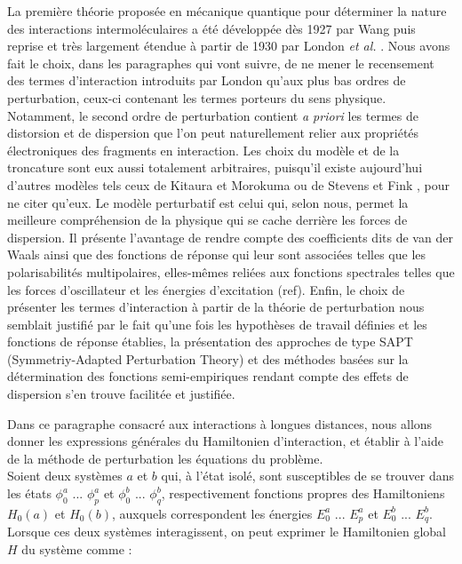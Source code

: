 \documentclass[12pt,a4paper]{book}
\begin{document}
	
	La première théorie proposée en mécanique quantique pour déterminer la nature des interactions intermoléculaires a été développée dès 1927 par Wang \cite{wang1927mutual} puis reprise et très largement étendue à partir de 1930 par London \textit{et al.} \cite{london1930z}. Nous avons fait le choix, dans les paragraphes qui vont suivre, de ne mener le recensement des termes d’interaction introduits par London qu'aux plus bas ordres de perturbation, ceux-ci contenant les termes porteurs du sens physique. Notamment, le second ordre de perturbation contient \textit{a priori} les termes de distorsion et de dispersion que l’on peut naturellement relier aux propriétés électroniques des fragments en interaction. Les choix du modèle et de la troncature sont eux aussi totalement arbitraires, puisqu’il existe aujourd’hui d’autres modèles tels ceux de Kitaura et Morokuma \cite{morokuma1977molecules} ou de Stevens et Fink \cite{stevens1987frozen}, pour ne citer qu’eux. Le modèle perturbatif est celui qui, selon nous, permet la meilleure compréhension de la physique qui se cache derrière les forces de dispersion. Il présente l'avantage de rendre compte des coefficients dits de van der Waals ainsi que des fonctions de réponse qui leur sont associées telles que les polarisabilités multipolaires, elles-mêmes reliées aux fonctions spectrales telles que les forces d’oscillateur et les énergies d’excitation (ref). Enfin, le choix de présenter les termes d’interaction à partir de la théorie de perturbation nous semblait justifié par le fait qu’une fois les hypothèses de travail définies et les fonctions de réponse établies, la présentation des approches de type SAPT (Symmetriy-Adapted Perturbation Theory) et des méthodes basées sur la détermination des fonctions semi-empiriques rendant compte des effets de dispersion s’en trouve facilitée et justifiée.
	
	
	Dans ce paragraphe consacré aux interactions à longues distances, nous allons donner les expressions générales du Hamiltonien d'interaction, et établir à l'aide de la méthode de perturbation les équations du problème.\\ 
	
	Soient deux systèmes $a$ et $b$ qui, à l'état isolé, sont susceptibles de se trouver dans les états $\phi_{0}^{a}$ ... $\phi_{p}^{a}$ et $\phi_{0}^{b}$ ... $\phi_{q}^{b}$, respectivement fonctions propres des Hamiltoniens $H_{0}(a)$ et $H_{0}(b)$, auxquels correspondent les énergies $E_{0}^{a}$ ... $E_{p}^{a}$ et $E_{0}^{b}$ ... $E_{q}^{b}$. Lorsque ces deux systèmes interagissent, on peut exprimer le Hamiltonien global $H$ du système comme : 
	
\end{document}
